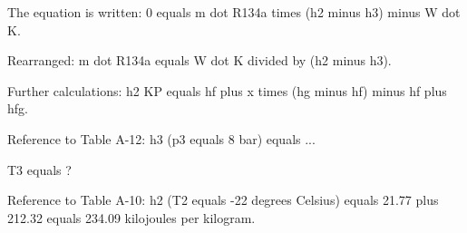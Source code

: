 The equation is written:  
0 equals m dot R134a times (h2 minus h3) minus W dot K.  

Rearranged:  
m dot R134a equals W dot K divided by (h2 minus h3).  

Further calculations:  
h2 KP equals hf plus x times (hg minus hf) minus hf plus hfg.  

Reference to Table A-12:  
h3 (p3 equals 8 bar) equals ...  

T3 equals ?  

Reference to Table A-10:  
h2 (T2 equals -22 degrees Celsius) equals 21.77 plus 212.32 equals 234.09 kilojoules per kilogram.